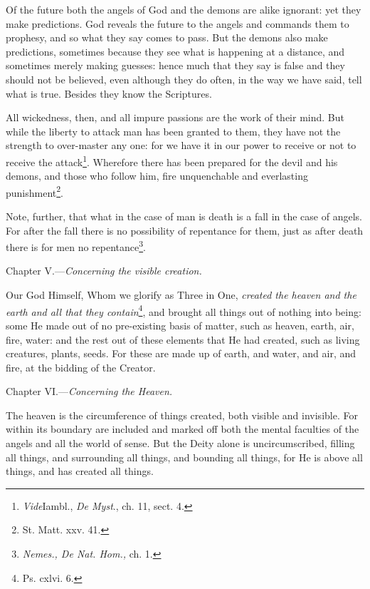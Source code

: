 Of the future both the angels of God and the demons are alike ignorant: yet they make predictions. God reveals the future to the angels and commands them to prophesy, and so what they say comes to pass. But the demons also make predictions, sometimes because they see what is happening at a distance, and sometimes merely making guesses: hence much that they say is false and they should not be believed, even although they do often, in the way we have said, tell what is true. Besides they know the Scriptures.

All wickedness, then, and all impure passions are the work of their mind. But while the liberty to attack man has been granted to them, they have not the strength to over-master any one: for we have it in our power to receive or not to receive the attack\footnote{\emph{Vide}Iambl., \emph{De Myst}., ch. 11, sect. 4.}. Wherefore there has been prepared for the devil and his demons, and those who follow him, fire unquenchable and everlasting punishment\footnote{St. Matt. xxv. 41.}.

Note, further, that what in the case of man is death is a fall in the case of angels. For after the fall there is no possibility of repentance for them, just as after death there is for men no repentance\footnote{\emph{Nemes., De Nat. Hom., }ch. 1.}.


Chapter V.—\emph{Concerning the visible creation.}

Our God Himself, Whom we glorify as Three in One, \emph{created the heaven and the earth and all that they contain}\footnote{Ps. cxlvi. 6.}, and brought all things out of nothing into being: some He made out of no pre-existing basis of matter, such as heaven, earth, air, fire, water: and the rest out of these elements that He had created, such as living creatures, plants, seeds. For these are made up of earth, and water, and air, and fire, at the bidding of the Creator.


Chapter VI.—\emph{Concerning the Heaven.}

The heaven is the circumference of things created, both visible and invisible. For within its boundary are included and marked off both the mental faculties of the angels and all the world of sense. But the Deity alone is uncircumscribed, filling all things, and surrounding all things, and bounding all things, for He is above all things, and has created all things.


